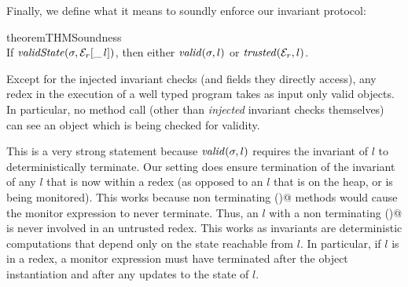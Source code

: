 Finally, we define what it means to soundly enforce our invariant protocol:
\SS\begin{restatable}[Soundness]{theorem}{THMSoundness}\ \\ %
\indent If $\mathit{validState}(\sigma, \mathcal{E}_r{}[\_\,l])$, then either $\mathit{valid}(\sigma,l)$ or $\mathit{trusted}(\mathcal{E}_r{},l)$.
\end{restatable}\SS\noindent
Except for the injected invariant checks (and fields they directly access),
any redex in the execution of a well typed program takes as input only valid objects.
In particular, no method call (other than \emph{injected} invariant checks themselves) can see an object which is being checked for validity.

This is a very strong statement because $\mathit{valid}(\sigma,l)$ requires
the invariant of $l$ to deterministically terminate.
Our setting does ensure termination of the invariant of any $l$ that is now within a redex (as opposed to an $l$ that is on the heap, or is being monitored).
This works because non terminating \Q@invariant()@ methods would cause the monitor expression to never terminate. Thus, an
$l$ with a non terminating \Q@invariant()@ is never involved in an untrusted redex.
This works as invariants are deterministic computations that depend only on the state reachable from $l$.
In particular, if $l$ is in a redex, a monitor expression must have terminated after the object instantiation
and after any updates to the state of $l$.


\lstset{language=FortyThree} %